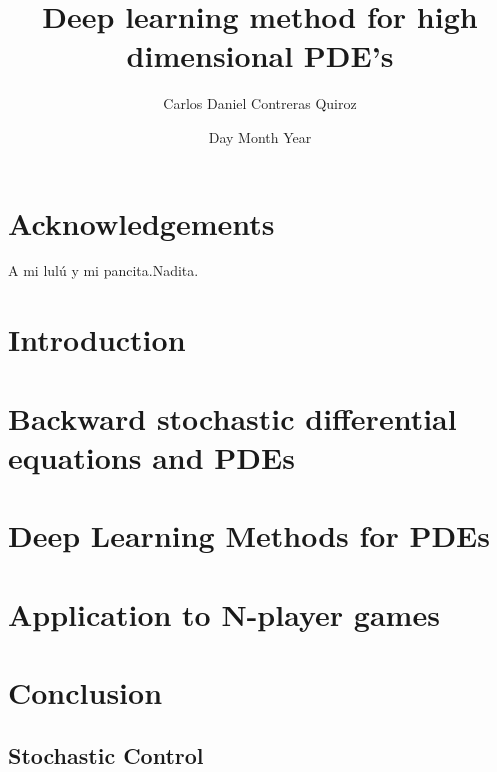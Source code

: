 \documentclass[11pt]{report}
\title{Deep learning method for high dimensional PDE's}
\author{Carlos Daniel Contreras Quiroz}
\date{Day Month Year}
\begin{document}





\chapter*{Acknowledgements}
A mi lulú y mi pancita.Nadita.

\newpage

\tableofcontents
\listoffigures






\chapter{Introduction}


\chapter{Backward stochastic differential equations and PDEs}


\chapter{Deep Learning Methods for PDEs}


\chapter{Application to N-player games}


\chapter{Conclusion}


\begin{appendices}
	\chapter{Stochastic Control}
	
\end{appendices}



\printbibliography
\end{document}
